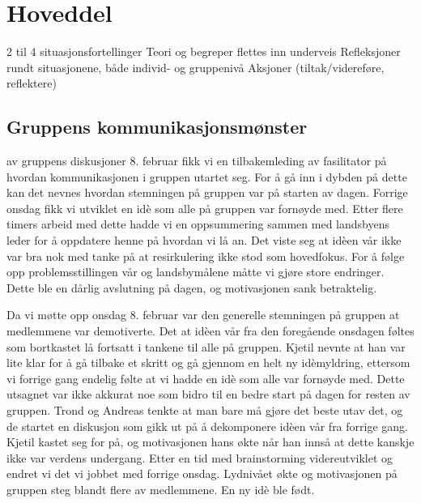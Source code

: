 \section{Hoveddel} 2 til 4 situasjonsfortellinger Teori og begreper
flettes inn underveis Refleksjoner rundt situasjonene, både individ- og
gruppenivå Aksjoner (tiltak/videreføre, reflektere)


\subsection{Gruppens kommunikasjonsmønster} %
av gruppens diskusjoner 8. februar fikk vi en tilbakemleding av
fasilitator på hvordan kommunikasjonen i gruppen utartet seg. For å gå
inn i dybden på dette kan det nevnes hvordan stemningen på gruppen var
på starten av dagen. Forrige onsdag fikk vi utviklet en idè som alle på
gruppen var fornøyde med. Etter flere timers arbeid med dette hadde vi
en oppsummering sammen med landsbyens leder for å oppdatere henne på
hvordan vi lå an. Det viste seg at idèen vår ikke var bra nok med tanke
på at resirkulering ikke stod som hovedfokus. For å følge opp
problemsstillingen vår og landsbymålene måtte vi gjøre store endringer.
Dette ble en dårlig avslutning på dagen, og motivasjonen sank
betraktelig. 

Da vi møtte opp onsdag 8. februar var den generelle stemningen på
gruppen at medlemmene var demotiverte. Det at idèen vår fra den
foregående onsdagen føltes som bortkastet lå fortsatt i tankene til alle
på gruppen. Kjetil nevnte at han var lite klar for å gå tilbake et
skritt og gå gjennom en helt ny idèmyldring, ettersom vi forrige gang
endelig følte at vi hadde en idè som alle var fornøyde med. Dette
utsagnet var ikke akkurat noe som bidro til en bedre start på dagen for
resten av gruppen. Trond og Andreas tenkte at man bare må gjøre det
beste utav det, og de startet en diskusjon som gikk ut på å dekomponere
idèen vår fra forrige gang. Kjetil kastet seg for på, og motivasjonen
hans økte når han innså at dette kanskje ikke var verdens undergang.
Etter en tid med brainstorming videreutviklet og endret vi det vi jobbet
med forrige onsdag. Lydnivået økte og motivasjonen på gruppen steg
blandt flere av medlemmene. En ny idè ble født.

